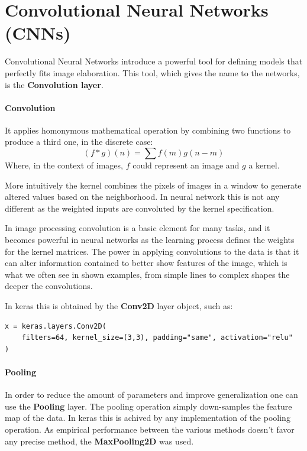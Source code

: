 \newpage


\section{Convolutional Neural Networks (CNNs)}
\label{sec:convolutional-neural-networks-(cnns)}

Convolutional Neural Networks introduce a powerful tool for defining models that perfectly fits image elaboration.
This tool, which gives the name to the networks, is the \textbf{Convolution layer}.

\paragraph{Convolution}
It applies homonymous mathematical operation by combining two functions to produce a third one, in the discrete case:
\[(f\ast g)(n) = \sum f(m)g(n-m)\]
Where, in the context of images, $f$ could represent an image and $g$ a kernel.

More intuitively the kernel combines the pixels of images in a window to generate altered values based on the neighborhood.
In neural network this is not any different as the weighted inputs are convoluted by the kernel specification.

In image processing convolution is a basic element for many tasks, and it becomes powerful in neural networks
as the learning process defines the weights for the kernel matrices.
The power in applying convolutions to the data is that it can alter information contained to better show features of
the image, which is what we often see in shown examples, from simple lines to complex shapes the deeper the convolutions.

In keras this is obtained by the \textbf{Conv2D}\cite{con2d} layer object, such as:
\begin{verbatim}
x = keras.layers.Conv2D(
    filters=64, kernel_size=(3,3), padding="same", activation="relu"
)
\end{verbatim}

\paragraph{Pooling}
In order to reduce the amount of parameters and improve generalization one can use the \textbf{Pooling} layer.
The pooling operation simply down-samples the feature map of the data. In keras this is achived by any implementation
of the pooling operation. As empirical performance between the various methods\cite{bieder2021comparison}
doesn't favor any precise method, the \textbf{MaxPooling2D}\cite{maxpooling2d} was used.

